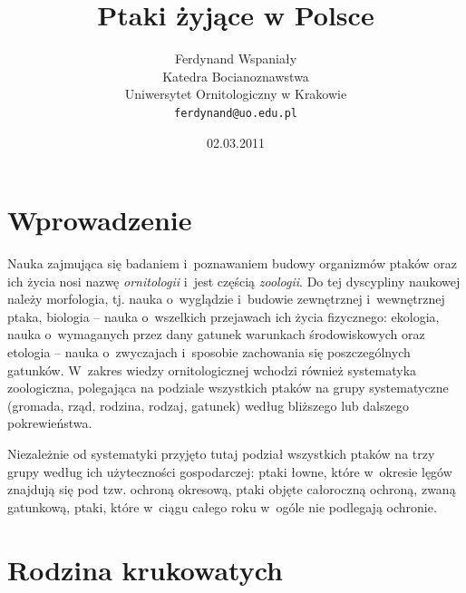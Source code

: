 \documentclass[a4paper,10pt]{report}
\title{Ptaki żyjące w Polsce}
\author{Ferdynand Wspaniały\\
\small Katedra Bocianoznawstwa\\
\small Uniwersytet Ornitologiczny w Krakowie\\
\small \texttt{ferdynand@uo.edu.pl}\\
}
\date{02.03.2011}
\begin{document}
\maketitle

%




\chapter{Wprowadzenie}
\label{cha:wprowadzenie}

Nauka zajmująca się badaniem i~poznawaniem budowy organizmów ptaków oraz ich życia nosi nazwę \emph{ornitologii} i~jest częścią \emph{zoologii}. Do tej dyscypliny naukowej należy morfologia, tj. nauka o~wyglądzie i~budowie zewnętrznej i~wewnętrznej ptaka, biologia -- nauka o~wszelkich przejawach ich życia fizycznego: ekologia, nauka o~wymaganych przez dany gatunek warunkach środowiskowych oraz etologia -- nauka o~zwyczajach i~sposobie zachowania się poszczególnych gatunków. W~zakres wiedzy ornitologicznej wchodzi również systematyka zoologiczna, polegająca na podziale wszystkich ptaków na grupy systematyczne (gromada, rząd, rodzina, rodzaj, gatunek) według bliższego lub dalszego pokrewieństwa. 

Niezależnie od systematyki przyjęto tutaj podział wszystkich ptaków na trzy grupy według ich użyteczności gospodarczej: ptaki łowne, które w~okresie lęgów znajdują się pod tzw. ochroną okresową, ptaki objęte całoroczną ochroną, zwaną gatunkową, ptaki, które w~ciągu całego roku w~ogóle nie podlegają ochronie.


\chapter{Rodzina krukowatych}
\label{cha:rodzinakrukowatych}
\end{document}
